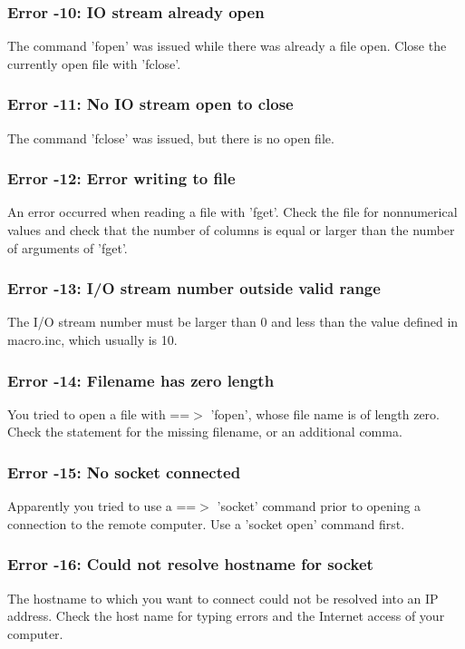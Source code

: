 \subsubsection{Error -10: IO stream already open}
\par
The command 'fopen' was issued while there was already a file open. 
Close the currently open file with 'fclose'. 
\subsubsection{Error -11: No IO stream open to close}
\par
The command 'fclose' was issued, but there is no open file. 
\subsubsection{Error -12: Error writing to file}
\par
An error occurred when reading a file with 'fget'. Check the file 
for nonnumerical values and check that the number of columns is 
equal or larger than the number of arguments of 'fget'. 
\par
\subsubsection{Error -13: I/O stream number outside valid range}
\par
The I/O stream number must be larger than 0 and less than the value 
defined in macro.inc, which usually is 10. 
\par
\subsubsection{Error -14: Filename has zero length}
\par
You tried to open a file with ==$> $ 'fopen', whose file name is of 
length zero. 
Check the statement for the missing filename, or an additional comma. 
\subsubsection{Error -15: No socket connected}
\par
Apparently you tried to use a ==$> $ 'socket' command prior to opening 
a connection to the remote computer. 
Use a 'socket open' command first. 
\subsubsection{Error -16: Could not resolve hostname for socket}
\par
The hostname to which you want to connect could not be resolved into 
an IP address. 
Check the host name for typing errors and the Internet access of your 
computer. 
